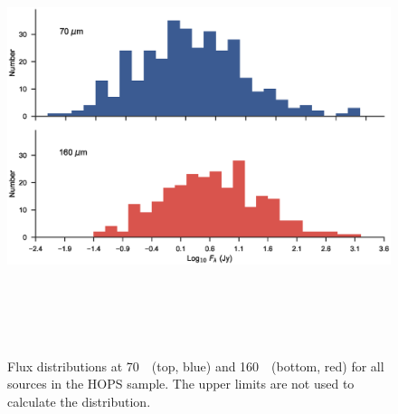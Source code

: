 \documentclass[manuscript]{aastex61}
\begin{document}
\begin{figure}[ht]
\centering
\includegraphics[height=5in]{figures/LFs.eps}
\caption{Flux distributions at 70~\micron\ (top, blue) and 160~\micron\ (bottom, red) for all sources in the HOPS sample.  The upper limits are not used to calculate the distribution.\label{fig:fd}}
\end{figure}
\end{document}
